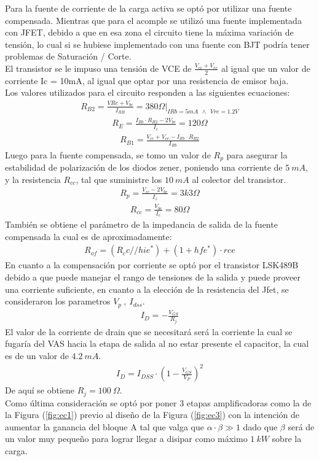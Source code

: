 Para la fuente de corriente de la carga activa se optó por utilizar una fuente compensada. Mientras que para el acomple se utilizó una fuente implementada con JFET, debido a que en esa zona el circuito tiene la máxima variación de tensión, lo cual si se hubiese implementado con una fuente con BJT podría tener problemas de Saturación / Corte.\\
El transistor se le impuso una tensión de VCE de $\frac{V_{cc}+V_{ee}}{2}$ al igual que un valor de corriente Ic = 10mA, al igual que optar por una resistencia de emisor baja.\\
Los valores utilizados para el circuito responden a las siguientes ecuaciones:
\begin{align}
R_{B2}= \frac{V{Re}+V_{be}}{I_{RB}} = 380 \Omega |_{IRb=5mA \  \ \wedge \ \  Vre=1.2V}
\end{align}
\begin{align}
R_E=\frac{I_{Rb}\cdot R_{B2}-2V_{be}}{I_c}=120\Omega
\end{align}
\begin{align}
R_{B1}= \frac{V_{cc}+V_{ee}-I_{Rb}\cdot R_{B2}}{I_{Rb}}
\end{align}
Luego para la fuente compensada, se tomo un valor de $R_p$ para asegurar la estabilidad de polarización de los diodos zener, poniendo una corriente de $5 \ mA$, y la resistencia $R_{cc}$, tal que suministre los $10 \ mA$ al colector del transistor.
\begin{align}
R_p = \frac{V_{cc}-2V_{be}}{I_z}=3k3\Omega
\end{align}
\begin{align}
R_{cc}=\frac{V_{be}}{I_c}=80\Omega
\end{align}
También se obtiene el parámetro de la impedancia de salida de la fuente compensada la cual es de aproximadamente:
\begin{align}
R_{of} = (R_cc // hie^*)+(1+hfe^* )\cdot rce
\end{align}
En cuanto a la compensación por corriente se optó por el transistor LSK489B  debido a que puede manejar el rango de tensiones de la salida y puede proveer una corriente suficiente, en cuanto a la  elección de la resistencia del Jfet, se consideraron los parametros $V_p \ , \ I_{dss}$.
\begin{align}
I_D=-\frac{V_{GS}}{R_j}
\end{align}
El valor de la corriente de drain que se necesitará será la corriente la cual se fugaría del VAS hacia la etapa de salida al no estar presente el capacitor, la cual es de un valor de $4.2 \ mA$.
\begin{align}
I_D= I_{DSS} \cdot \left(1-\frac{V_{GS}}{V_P} \right)^2
\end{align}
De aquí se obtiene $R_j = 100 \ \Omega$.\\
Como última consideración se optó por poner 3 etapas amplificadoras como la de la Figura (\ref{fig:ec1}) previo al diseño de la Figura (\ref{fig:ec3}) con la intención de aumentar la ganancia del bloque A tal  que valga que $\alpha \cdot \beta \gg 1$ dado que $\beta$ será de un valor muy pequeño para lograr llegar a disipar como máximo $1 \ kW$ sobre la carga.
